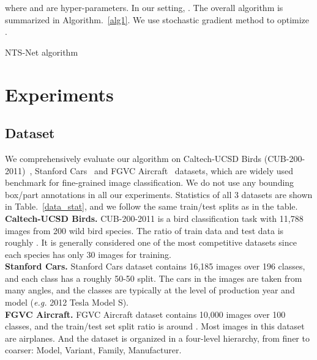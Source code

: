\documentclass[runningheads]{llncs}
\begin{document}
where  and  are hyper-parameters. In our setting, . The overall algorithm is summarized in Algorithm.~\ref{alg1}. We use stochastic gradient method to optimize .

\begin{algorithm}
\caption{NTS-Net algorithm}
\label{alg1}
\LinesNumbered
{}
\end{algorithm}

\section{Experiments}\label{experiments}
\subsection{Dataset}
We comprehensively evaluate our algorithm on Caltech-UCSD Birds (CUB-200-2011)~\cite{WahCUB_200_2011}, Stanford Cars~\cite{Krause20133D} and FGVC Aircraft~\cite{maji13fine-grained} datasets, which are widely used benchmark for fine-grained image classification. We do not use any bounding box/part annotations in all our experiments. Statistics of all 3 datasets are shown in Table.~\ref{data_stat}, and we follow the same train/test splits as in the table.
\textbf{Caltech-UCSD Birds.}
CUB-200-2011 is a bird classification task with 11,788 images from 200 wild bird species. The ratio of train data and test data is roughly . It is generally considered one of the most competitive datasets since each species has only 30 images for training.\\
\textbf{Stanford Cars.}
Stanford Cars dataset contains 16,185 images over 196 classes, and each class has a roughly 50-50 split. The cars in the images are taken from many angles, and the classes are typically at the level of production year and model (\emph{e.g.} 2012 Tesla Model S).\\
\textbf{FGVC Aircraft.}
FGVC Aircraft dataset contains 10,000 images over 100 classes, and the train/test set split ratio is around . Most images in this dataset are airplanes. And the dataset is organized in a four-level hierarchy, from finer to coarser: Model, Variant, Family, Manufacturer.
\end{document}
